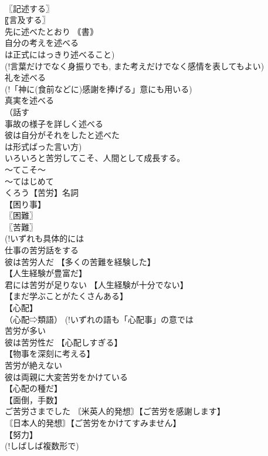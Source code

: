 \documentclass[8pt]{extreport}
\begin{document}
\begin{CJK}{UTF8}{min}
\\	〖記述する〗
\\	〖言及する〗
\\	先に述べたとおり ｟書｠
\\	自分の考えを述べる 
\\	は正式にはっきり述べること) 
\\	(!言葉だけでなく身振りでも, また考えだけでなく感情を表してもよい) 
\\	礼を述べる 
\\	(!「神に(食前などに)感謝を捧げる」意にも用いる) 
\\	真実を述べる 
\\	（話す
\\	事故の様子を詳しく述べる 
\\	彼は自分がそれをしたと述べた 
\\	は形式ばった言い方)
\\	いろいろと苦労してこそ、人間として成長する。		
\\	〜てこそ〜　
\\	〜てはじめて 
\\	くろう【苦労】名詞 
\\	【困り事】 
\\	〖困難〗
\\	〖苦難〗
\\	(!いずれも具体的には 
\\	仕事の苦労話をする 
\\	彼は苦労人だ 【多くの苦難を経験した】
\\	【人生経験が豊富だ】
\\	君には苦労が足りない 【人生経験が十分でない】
\\	【まだ学ぶことがたくさんある】
\\	【心配】 
\\	（心配⇨類語） (!いずれの語も「心配事」の意では 
\\	苦労が多い 
\\	彼は苦労性だ 【心配しすぎる】
\\	【物事を深刻に考える】
\\	苦労が絶えない 
\\	彼は両親に大変苦労をかけている 
\\	【心配の種だ】
\\	【面倒，手数】 
\\	ご苦労さまでした 〘米英人的発想〙【ご苦労を感謝します】
\\	〘日本人的発想〙【ご苦労をかけてすみません】
\\	【努力】 
\\	(!しばしば複数形で) 

\end{CJK}
\end{document}
